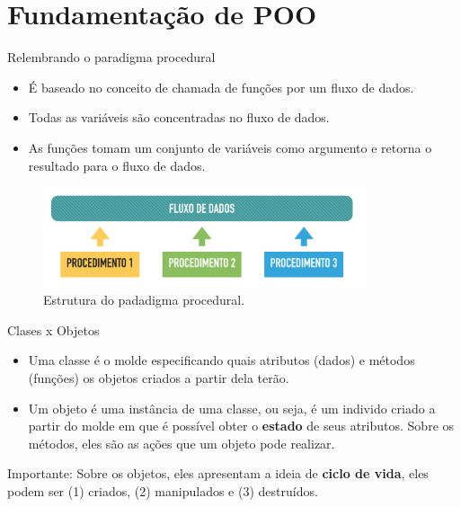 \section{Fundamentação de POO}

\begin{frame}{Relembrando o paradigma procedural}
  \begin{itemize}
    \item É baseado no conceito de chamada de funções por um fluxo de dados.
    \item Todas as variáveis são concentradas no fluxo de dados.
    \item As funções tomam um conjunto de variáveis como argumento e retorna o resultado para o fluxo de dados.
  \end{itemize}
  \begin{figure}
    \includegraphics[width=0.85\textwidth]{figuras/fluxo.png}
    \caption{Estrutura do padadigma procedural.}
  \end{figure}
\end{frame}

\begin{frame}{Clases x Objetos}
  \begin{itemize}
    \item Uma classe é o molde especificando quais atributos (dados) e métodos (funções) os objetos criados a partir dela terão.\pause
    \item Um objeto é uma instância de uma classe, ou seja, é um individo criado a partir do molde em que é possível obter o \textbf{estado} de seus atributos. Sobre os métodos, eles são as ações que um objeto pode realizar.
  \end{itemize}
  \pause
  {\color{red}Importante}: Sobre os objetos, eles apresentam a ideia de \textbf{ciclo de vida}, eles podem ser (1) criados, (2) manipulados e (3) destruídos.
\end{frame}

